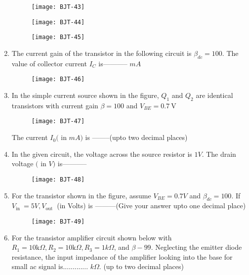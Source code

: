 \begin{enumerate}
\begin{tasks}
\begin{figure}[H]
			\centering
			\texttt{[image: BJT-43]}
		\end{figure}
		\task[\textbf{C.}] \begin{figure}[H]
			\centering
			\texttt{[image: BJT-44]}
		\end{figure}
		\task[\textbf{D.}] \begin{figure}[H]
			\centering
			\texttt{[image: BJT-45]}
		\end{figure}
	\end{tasks}
	\item The current gain of the transistor in the following circuit is $\beta_{d c}=100$. The value of collector current $I_{C}$ is----------- $m A$
	{	}
	\begin{figure}[H]
		\centering
		\texttt{[image: BJT-46]}
	\end{figure}
	\item In the simple current source shown in the figure, $Q_{1}$ and $Q_{2}$ are identical transistors with current gain $\beta=100$ and $V_{B E}=0.7 \mathrm{~V}$\\
	\begin{figure}[H]
		\centering
		\texttt{[image: BJT-47]}
	\end{figure}
	The current $I_{0}($ in $m A)$ is --------(upto two decimal places)
	{	}
	\item In the given circuit, the voltage across the source resistor is $1 V$. The drain voltage $($ in $V)$ is-----------
	{	}
	\begin{figure}[H]
		\centering
		\texttt{[image: BJT-48]}
	\end{figure}
	\item For the transistor shown in the figure, assume $V_{B E}=0.7 V$ and $\beta_{d c}=100$. If $V_{\text {in }}=5 V, V_{\text {out }}$ (in Volts) is ---------(Give your answer upto one decimal place)
	{	}
	\begin{figure}[H]
		\centering
		\texttt{[image: BJT-49]}
	\end{figure}
	\item For the transistor amplifier circuit shown below with $R_{1}=10 \mathrm{k} \Omega, R_{2}=10 \mathrm{k} \Omega, R_{3}=1 k \Omega$, and $\beta-99$. Neglecting the emitter diode resistance, the input impedance of the amplifier looking into the base for small ac signal is............. $k \Omega$. (up to two decimal places)

\end{enumerate}
